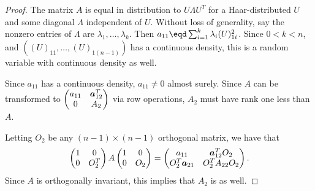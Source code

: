 \begin{proof}
    The matrix $A$ is equal in distribution to $U \Lambda U^T$ for a
    Haar-distributed $U$ and some diagonal $\Lambda$ independent of $U$.  
    Without loss of generality, say the nonzero entries of $\Lambda$ are
    $\lambda_{1}, \ldots, \lambda_k$.  Then 
    $a_{11} \eqd \sum_{i=1}^k \lambda_i (U)_{1i}^2$.  Since $0 < k < n$, 
    and $((U)_{11}, \ldots, (U)_{1(n-1)})$ has a continuous density, this is a
    random variable with continuous density as well.
    
    Since $a_{11}$ has a continuous density, $a_{11} \neq 0$ almost surely.
    Since $A$ can be transformed to
    \(
        \left(
        \begin{matrix}
            a_{11} & \boldsymbol{a}_{12}^T \\
            0      & A_2
        \end{matrix}
        \right)
    \)
    via row operations, $A_2$ must have rank one less than $A$.
    
    Letting $O_2$ be any $(n-1)\times(n-1)$ orthogonal matrix, we have
    that
    \[
        \left(
        \begin{matrix}
            1 & 0 \\
            0 & O_2^T
        \end{matrix}
        \right)
        A
        \left(
        \begin{matrix}
            1 & 0 \\
            0 & O_2
        \end{matrix}
        \right)
        =
        \left(
        \begin{matrix}
            a_{11}   & \boldsymbol{a}_{12}^T O_2 \\
            O_2^T \boldsymbol{a}_{21} & O_2^T A_{22} O_2
        \end{matrix}
        \right).
    \]
    Since $A$ is orthogonally invariant, this implies that $A_2$ is
    as well.
\end{proof}


